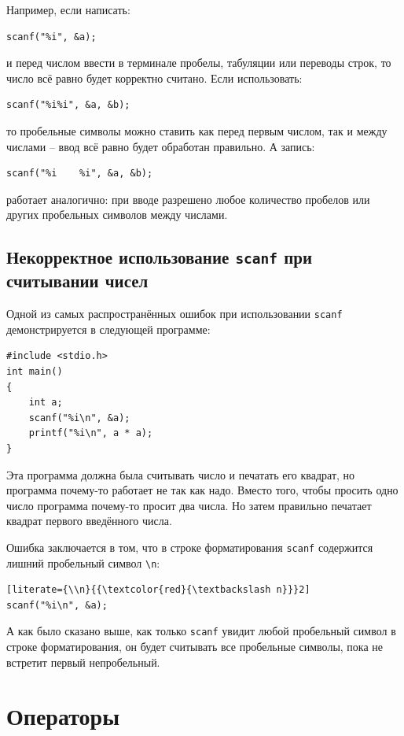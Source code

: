 \documentclass{article}
\begin{document}
Например, если написать:
\begin{lstlisting}
scanf("%i", &a);
\end{lstlisting}
и перед числом ввести в терминале пробелы, табуляции или переводы строк, то число всё равно будет корректно считано. Если использовать:
\begin{lstlisting}
scanf("%i%i", &a, &b);
\end{lstlisting}
то пробельные символы можно ставить как перед первым числом, так и между числами -- ввод всё равно будет обработан правильно. А запись:
\begin{lstlisting}
scanf("%i    %i", &a, &b);
\end{lstlisting}
работает аналогично: при вводе разрешено любое количество пробелов или других пробельных символов между числами.


\subsection*{Некорректное использование \texttt{scanf} при считывании чисел}
Одной из самых распространённых ошибок при использовании \texttt{scanf} демонстрируется в следующей программе:
\begin{lstlisting}
#include <stdio.h>
int main()
{
    int a;
    scanf("%i\n", &a);
    printf("%i\n", a * a);
}
\end{lstlisting}
Эта программа должна была считывать число и печатать его квадрат, но программа почему-то работает не так как надо. Вместо того, чтобы просить одно число программа почему-то просит два числа. Но затем правильно печатает квадрат первого введённого числа.

\noindent Ошибка заключается в том, что в строке форматирования \texttt{scanf} содержится лишний пробельный символ \texttt{\textbackslash n}:
\begin{lstlisting}[literate={\\n}{{\textcolor{red}{\textbackslash n}}}2]
scanf("%i\n", &a);
\end{lstlisting}
А как было сказано выше, как только \texttt{scanf} увидит любой пробельный символ в строке форматирования, он будет считывать все пробельные символы, пока не встретит первый непробельный.


\newpage
\section*{Операторы}
\end{document}
